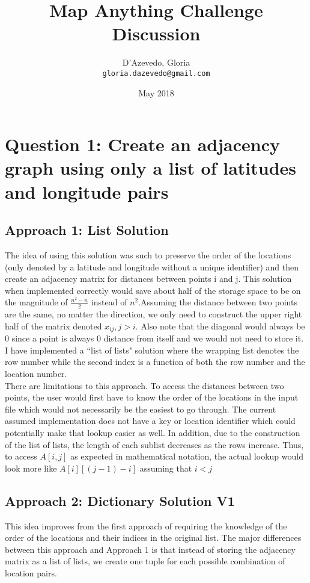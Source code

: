 \documentclass{article}
\title{Map Anything Challenge Discussion}
\author{
  D'Azevedo, Gloria\\
  \texttt{gloria.dazevedo@gmail.com}\\
}
\date{May 2018}
\begin{document}
\maketitle

\section{Question 1: Create an adjacency graph using only a list of latitudes and longitude pairs}
\subsection{Approach 1: List Solution}
The idea of using this solution was such to preserve the order of the locations (only denoted by a latitude and longitude without a unique identifier) and then create an adjacency matrix for distances between points i and j.  This solution when implemented correctly would save about half of the storage space to be on the magnitude of $\frac{n^2-n}{2}$ instead of $n^2$.Assuming the distance between two points are the same, no matter the direction, we only need to construct
the upper right half of the matrix denoted $x_{ij}, j>i$.  Also note that the diagonal would always be 0 since a point is always 0 distance from itself and we would not need to store it.  I have implemented a ``list of lists" solution where the wrapping list denotes the row number while the second index is a function of both the row number and the location number.  \\

There are limitations to this approach.  To access the distances between two points, the user would first have to know the order of the locations in the input file which would not necessarily be the easiest to go through.  The current assumed implementation does not have a key or location identifier which could potentially make that lookup easier as well.  In addition, due to the construction of the list of lists, the length of each sublist decreases as the rows increase.  Thus, to access $A[i,j]$ as expected in mathematical notation, the actual lookup would look more like $A[i][(j-1)-i]$ assuming that $i<j$

\subsection{Approach 2: Dictionary Solution V1}
This idea improves from the first approach of requiring the knowledge of the order of the locations and their indices in the original list.  The major differences between this approach and Approach 1 is that instead of storing the adjacency matrix as a list of lists, we create one tuple for each possible combination of location pairs. \\
\end{document}

